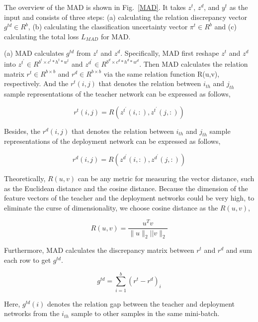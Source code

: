 \documentclass[10pt,twocolumn,letterpaper]{article}
\begin{document}
The overview of the MAD is shown in Fig.~\ref{MAD}. It takes $z^{t}$, $z^{d}$, and $y^{t}$ as the input and consists of three steps: (a) calculating the relation discrepancy vector $g^{td} \in R^{b}$, (b) calculating the classification uncertainty vector $\pi^{t} \in R^{b}$ and (c) calculating the total loss $ L_{MAD}$ for MAD. 

(a) MAD calculates $g^{td}$ from $z^{t}$ and $z^{d}$. Specifically, MAD first reshape $z^{t}$ and $z^{d}$ into $z^{t^{\prime}} \in R^{b^{t} \times c^{t} * h^{t} * w^{t}}$ and $z^{d^{\prime}} \in R^{b^{d} \times c^{d} * h^{d} * w^{d}}$. Then MAD calculates the relation matrix $r^{t} \in R^{b \times b}$ and $r^{d} \in R^{b \times b}$ via the same relation function R(u,v), respectively. And the ${r}^{t}(i,j)$ that denotes the relation between $i_{th}$ and ${j_{th}}$ sample representations of the teacher network can be expressed as follows,



\begin{equation}
  {r}^{t}(i,j)=R(z^{t^{\prime}}(i,:),z^{t^{\prime}}(j,:))
\end{equation}

Besides, the ${r}^{d}(i,j)$ that denotes the relation between $i_{th}$ and ${j_{th}}$ sample representations of the deployment network can be expressed as follows,

\begin{equation}
r^{d}(i,j)=R(z^{d^{\prime}}(i,:),z^{d^{\prime}}(j,:))
\end{equation}

Theoretically, $R(u,v)$ can be any metric for measuring the vector distance, such as the Euclidean distance and the cosine distance. Because the dimension of the feature vectors of the teacher and the deployment networks could be very high, to eliminate the curse of dimensionality, we choose cosine distance as the $R(u,v)$,

\begin{equation}
  R(u,v)=\frac{{u}^{T} {v}}{\|{u}\|_{2}|| {v} \|_{2}}
\end{equation}

Furthermore, MAD calculates the discrepancy matrix between $r^{t}$ and $r^{d}$ and sum each row to get $g^{td}$.

\begin{equation}
g^{td}= \sum_{i=1}^{b} (r^t-r^d)_{i}
\end{equation}

Here, $g^{td}(i)$ denotes the relation gap between the teacher and deployment networks from the $i_{th}$ sample to other samples in the same mini-batch. 
\end{document}
